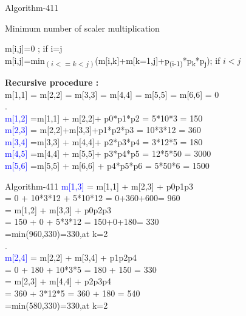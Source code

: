 \documentclass{beamer}
\begin{document}
\begin{frame}[t]{Algorithm-411}
\vspace{ 15 pt}

 
\begin{block}{Minimum number of scaler multiplication}
 
m[i,j]=0 ; if i=j \\
m[i,j]=min\textsubscript{$(i<=k<j)$}(m[i,k]+m[k=1,j]+p\textsubscript{(i-1)}*p\textsubscript{k}*p\textsubscript{j}); if $i<j$  
\end{block}

\vspace{15 pt}
\textbf{Recursive procedure : }\\
m[1,1] = m[2,2] = m[3,3] = m[4,4] = m[5,5] = m[6,6] = 0 \\.\\

\textcolor{blue}{m[1,2]} =m[1,1] + m[2,2]+ p0*p1*p2 = 5*10*3 = 150\\

\textcolor{blue}{m[2,3]} = m[2,2]+m[3,3]+p1*p2*p3 = 10*3*12 = 360\\

\textcolor{blue}{m[3,4]} =m[3,3] + m[4,4]+ p2*p3*p4 = 3*12*5 = 180\\

\textcolor{blue}{m[4,5]} =m[4,4] + m[5,5]+ p3*p4*p5 = 12*5*50 = 3000\\

\textcolor{blue}{m[5,6]} =m[5,5] + m[6,6] + p4*p5*p6 = 5*50*6 = 1500\\
\end{frame}

\begin{frame}[t]{Algorithm-411}
\vspace{15 pt}
\textcolor{blue}{m[1,3]} = m[1,1] + m[2,3] + p0p1p3 \\ = 0 + 10*3*12 + 5*10*12 =  0+360+600= 960\\

 =  m[1,2] + m[3,3] + p0p2p3 \\= 150 + 0 + 5*3*12 = 150+0+180= 330 \\
=min(960,330)=330,at k=2\\.\\

\textcolor{blue}{m[2,4]} =  m[2,2] + m[3,4] + p1p2p4 \\ = 0 + 180 + 10*3*5 = 180 + 150 = 330 \\
  =  m[2,3] + m[4,4] + p2p3p4  \\= 360 + 3*12*5 = 360 + 180 = 540\\
=min(580,330)=330,at k=2  
 

\end{frame}
\end{document}

